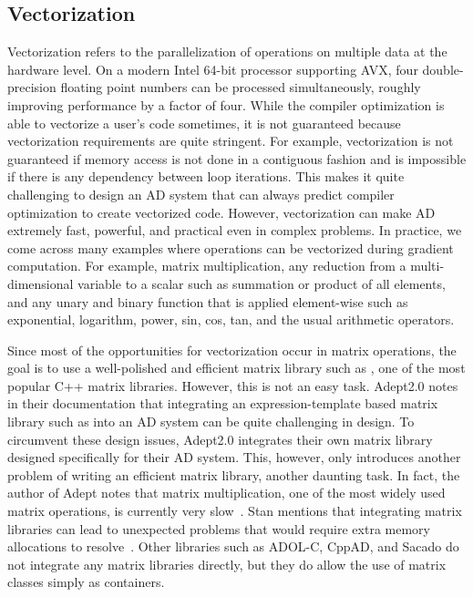 \subsection{Vectorization}\label{ssec:vectorization}

Vectorization refers to the parallelization of operations on multiple data at the hardware level.
On a modern Intel 64-bit processor supporting AVX, 
four double-precision floating point numbers can be processed simultaneously,
roughly improving performance by a factor of four.
While the compiler optimization is able to vectorize a user's code sometimes, it is not guaranteed
because vectorization requirements are quite stringent. 
For example, vectorization is not guaranteed if memory access is not done in a contiguous fashion
and is impossible if there is any dependency between loop iterations.
This makes it quite challenging to design an AD system that 
can always predict compiler optimization to create vectorized code.
However, vectorization can make AD extremely fast, powerful, and practical even in complex problems.
In practice, we come across many examples where operations can be vectorized during gradient computation.
For example, matrix multiplication, any reduction from a multi-dimensional variable to a scalar such as
summation or product of all elements, and any unary and binary function that is applied element-wise such as
exponential, logarithm, power, sin, cos, tan, and the usual arithmetic operators.

Since most of the opportunities for vectorization occur in matrix operations,
the goal is to use a well-polished and efficient
matrix library such as , one of the most popular C++ matrix libraries.
However, this is not an easy task.
Adept2.0 notes in their documentation that integrating an expression-template based matrix library 
such as  into an AD system can be quite challenging in design.
To circumvent these design issues, 
Adept2.0 integrates their own matrix library designed specifically for their AD system.
This, however, only introduces another problem of writing an efficient matrix library, another daunting task.
In fact, the author of Adept notes that matrix multiplication,
one of the most widely used matrix operations, 
is currently very slow~\cite{hogan:2014}.
Stan mentions that integrating matrix libraries can lead to unexpected problems 
that would require extra memory allocations to resolve~\cite{carpenter:2015}.
Other libraries such as ADOL-C, CppAD, and Sacado do not integrate any matrix libraries directly,
but they do allow the use of  matrix classes simply as containers.

